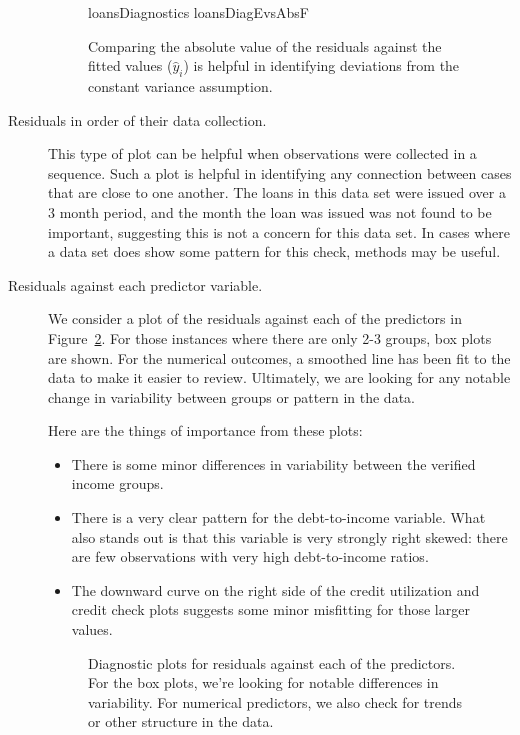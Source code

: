 \begin{description}
\begin{figure}
  \centering
      {loansDiagnostics}
      {loansDiagEvsAbsF}
  \caption{Comparing the absolute value of the residuals against the fitted values ($\hat{y}_i$) is helpful in identifying deviations from the constant variance assumption.}
  \label{loansDiagEvsAbsF}
\end{figure}

\item[Residuals in order of their data collection.]
    This type of plot can be helpful when observations were
    collected in a sequence.
    Such a plot is helpful in identifying any connection
    between cases that are close to one another.
    The loans in this data set were issued over a 3 month period,
    and the month the loan was issued was not found to be important,
    suggesting this is not a concern for this data set.
    In cases where a data set does show some pattern
    for this check,  methods may be useful.

\item[Residuals against each predictor variable.]
    We consider a plot of the residuals against each of
    the predictors in Figure~\ref{loansDiagEvsVariables}.
    For those instances where there are only 2-3 groups,
    box plots are shown.
    For the numerical outcomes, a smoothed line has been
    fit to the data to make it easier to review.
    Ultimately, we are looking for any notable change
    in variability between groups or pattern in the data.

    Here are the things of importance from these plots:
    \begin{itemize}
    \item
        There is some minor differences in variability
        between the verified income groups.
    \item
        There is a very clear pattern for the
        debt-to-income variable.
        What also stands out is that this variable
        is very strongly right skewed:
        there are few observations with very high
        debt-to-income ratios.
    \item
        The downward curve on the right side of the
        credit utilization and credit check plots suggests
        some minor misfitting for those larger values.
    \end{itemize}

\begin{figure}
  \centering
  \caption{Diagnostic plots for residuals against each of the
      predictors.
      For the box plots, we're looking for notable differences
      in variability.
      For numerical predictors, we also check for trends
      or other structure in the data.}
  \label{loansDiagEvsVariables}
\end{figure}

\end{description}

